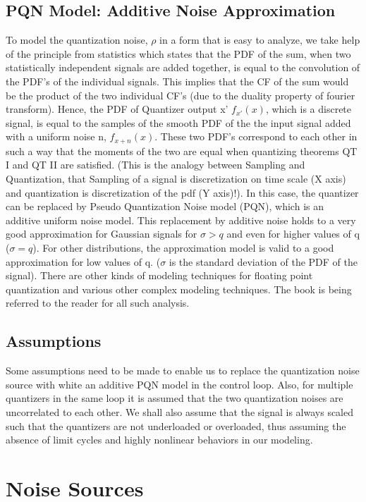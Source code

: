 \documentclass[a4paper,12pt]{article}
\begin{document}
\subsection{PQN Model: Additive Noise Approximation} To model the quantization noise, $\rho$ in a form that is easy to analyze, we take help of the principle from statistics which states that the PDF of the sum, when two statistically independent signals are added together, is equal to the convolution of the PDF's of the individual signals. This implies that the CF of the sum would be the product of the two individual CF's (due to the duality property of fourier transform).
Hence, the PDF of Quantizer output x' $f_{x'}(x)$, which is a discrete signal, is equal to the samples of the smooth PDF of the the input signal added with a uniform noise n, $f_{x+n}(x)$. These two PDF's correspond to each other in such a way that the moments of the two are equal when quantizing theorems QT I and QT II are satisfied. (This is the analogy between Sampling and Quantization, that Sampling of a signal is discretization on time scale (X axis) and quantization is discretization of the pdf (Y axis)!). In this case, the quantizer can be replaced by Pseudo Quantization Noise model (PQN), which is an additive uniform noise model. This replacement by additive noise holds to a very good approximation for Gaussian signals for $\sigma > q$ and even for higher values of q ($\sigma = q$). For other distributions, the approximation model is valid to a good approximation for low values of q. ($\sigma$ is the standard deviation of the PDF of the signal). There are other kinds of modeling techniques for floating point quantization and various other complex modeling techniques. The book \cite{Kollar} is being referred to the reader for all such analysis.
	\subsection{Assumptions}
Some assumptions need to be made to enable us to replace the quantization noise source with white an additive PQN model in the control loop. Also, for multiple quantizers in the same loop it is assumed that the two quantization noises are uncorrelated to each other.
We shall also assume that the signal is always scaled such that the quantizers are not underloaded or overloaded, thus assuming the absence of limit cycles and highly nonlinear behaviors in our modeling.


\section{Noise Sources}
\end{document}
